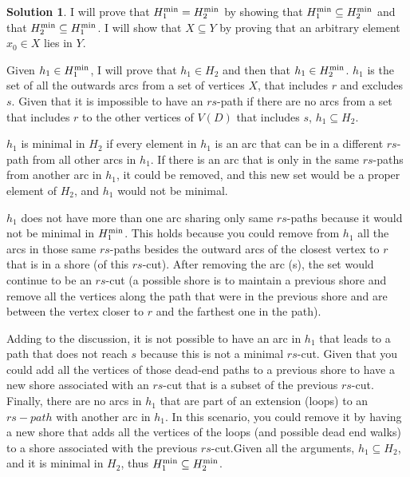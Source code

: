 \documentclass[11pt,leqno,final]{amsart}
\theoremstyle{definition}
\newtheorem{solution}{Solution}
\begin{document}
\begin{solution}

  I will prove that $H_{1}^{\textnormal{min}} = H_{2}^{\textnormal{min}}$ by showing that $H_{1}^{\textnormal{min}} \subseteq H_{2}^{\textnormal{min}}$ and that $H_{2}^{\textnormal{min}} \subseteq H_{1}^{\textnormal{min}}$. I will show that $X \subseteq Y$ by proving that an arbitrary element $x_0 \in X$ lies in $Y$.

  Given $ h_1 \in H_{1}^{\textnormal{min}}$, I will prove that $ h_1 \in H_{2}$ and then that $ h_1 \in H_{2}^{\textnormal{min}}$. $h_1$ is the set of all the outwards arcs from a set of vertices $X$, that includes $r$ and excludes $s$. Given that it is impossible to have an $rs$-path if there are no arcs from a set that includes $r$ to the other vertices of $V(D)$ that includes $s$, $h_1 \subseteq H_{2}$. 
  
  $h_1$ is minimal in $H_2$ if every element in $h_1$ is an arc that can be in a different $rs$-path from all other arcs in $h_1$. If there is an arc that is only in the same $rs$-paths from another arc in $h_1$, it could be removed, and this new set would be a proper element of $H_2$, and $h_1$ would not be minimal. 

  
  $h_1$ does not have more than one arc sharing only same $rs$-paths because it would not be minimal in $H_{1}^{\textnormal{min}}$. This holds because you could remove from $h_1$ all the arcs in those same $rs$-paths besides the outward arcs of the closest vertex to $r$ that is in a shore (of this $rs$-cut). After removing the arc (s), the set would continue to be an $rs$-cut (a possible shore is to maintain a previous shore and remove all the vertices along the path that were in the previous shore and are between the vertex closer to $r$ and the farthest one in the path).
  
  
  Adding to the discussion, it is not possible to have an arc in $h_1$ that leads to a path that does not reach $s$ because this is not a minimal $rs$-cut. Given that you could add all the vertices of those dead-end paths to a previous shore to have a new shore associated with an $rs$-cut that is a subset of the previous $rs$-cut. Finally, there are no arcs in $h_1$ that are part of an extension (loops) to an $rs-path$ with another arc in $h_1$. In this scenario, you could remove it by having a new shore that adds all the vertices of the loops (and possible dead end walks) to a shore associated with the previous $rs$-cut.Given all the arguments, $h_1 \subseteq H_{2}$, and it is minimal in $H_2$, thus $H_{1}^{\textnormal{min}} \subseteq H_{2}^{\textnormal{min}}$.
  

\end{solution}
\end{document}
